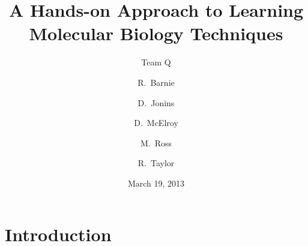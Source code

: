 \documentclass{beamer}
\title[PCR]{A Hands-on Approach to Learning Molecular Biology Techniques}
\subtitle{Team Q}
\author{R.~Barnie \and D.~Jonins \and D.~McElroy \and M.~Ross \and R.~Taylor}
\date{March 19, 2013}
\begin{document}
\section{Introduction}




\end{document}
